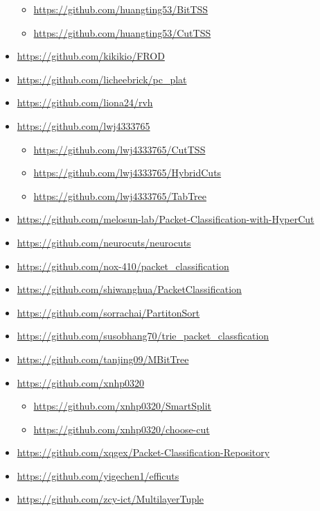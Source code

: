 \documentclass[acmsmall]{acmart}
\begin{document}
\begin{itemize}
  \begin{itemize}
  \item \url{https://github.com/huangting53/BitTSS}
  \item \url{https://github.com/huangting53/CutTSS}
  \end{itemize}
\item \url{https://github.com/kikikio/FROD}
\item \url{https://github.com/licheebrick/pc_plat}
\item \url{https://github.com/liona24/rvh}
\item \url{https://github.com/lwj4333765}
  \begin{itemize}
  \item \url{https://github.com/lwj4333765/CutTSS}
  \item \url{https://github.com/lwj4333765/HybridCuts}
  \item \url{https://github.com/lwj4333765/TabTree}
  \end{itemize}
\item \url{https://github.com/melosun-lab/Packet-Classification-with-HyperCut}
\item \url{https://github.com/neurocuts/neurocuts}
\item \url{https://github.com/nox-410/packet_classification}
\item \url{https://github.com/shiwanghua/PacketClassification}
\item \url{https://github.com/sorrachai/PartitonSort}
\item \url{https://github.com/susobhang70/trie_packet_classfication}
\item \url{https://github.com/tanjing09/MBitTree}
\item \url{https://github.com/xnhp0320}
  \begin{itemize}
  \item \url{https://github.com/xnhp0320/SmartSplit}
  \item \url{https://github.com/xnhp0320/choose-cut}
  \end{itemize}
\item \url{https://github.com/xqgex/Packet-Classification-Repository}
\item \url{https://github.com/yigechen1/efficuts}
\item \url{https://github.com/zcy-ict/MultilayerTuple}
\end{itemize}
\end{document}
